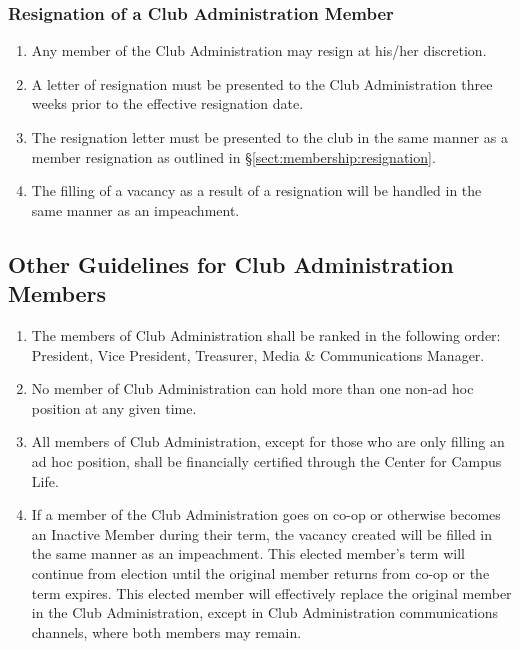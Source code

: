\documentclass[english,11pt]{article}
\begin{document}
\subsubsection{Resignation of a Club Administration Member} \label{subsect:cadmin:removal:resignation}

\begin{enumerate}[label=\alph*.]
    \item Any member of the Club Administration may resign at his/her discretion.
    \item A letter of resignation must be presented to the Club Administration three weeks prior to the effective resignation date.
    \item The resignation letter must be presented to the club in the same manner as a member resignation as outlined in §\ref{sect:membership:resignation}.
    \item The filling of a vacancy as a result of a resignation will be handled in the same manner as an impeachment.
\end{enumerate}

\subsection{Other Guidelines for Club Administration Members} \label{subsect:cadmin:other}

\begin{enumerate}[label=\Alph*.]
    \item The members of Club Administration shall be ranked in the following order: President, Vice President, Treasurer, Media \& Communications Manager.
    \item No member of Club Administration can hold more than one non-ad hoc position at any given time.
    \item All members of Club Administration, except for those who are only filling an ad hoc position, shall be financially certified through the Center for Campus Life.
    \item If a member of the Club Administration goes on co-op or otherwise becomes an Inactive Member during their term, the vacancy created will be filled in the same manner as an impeachment.
          This elected member's term will continue from election until the original member returns from co-op or the term expires.
          This elected member will effectively replace the original member in the Club Administration, except in Club Administration communications channels, where both members may remain.
\end{enumerate}
\end{document}
